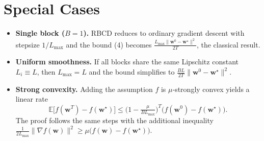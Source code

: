 \documentclass{article}
\newcommand{\E}{\mathbb{E}}
\begin{document}
\section*{Special Cases}
\begin{itemize}
\item \textbf{Single block ($B=1$).}  RBCD reduces to ordinary gradient descent
with stepsize $1/L_{\max}$ and the bound (4) becomes
$\frac{L_{\max}\|\bm w^{0}-\bm w^{\star}\|^{2}}{2T}$, the classical result.
\item \textbf{Uniform smoothness.}  If all blocks share the same Lipschitz constant
$L_i\equiv L$, then $L_{\max}=L$ and the bound simplifies to
$\frac{B L}{2T}\|\bm w^{0}-\bm w^{\star}\|^{2}$.
\item \textbf{Strong convexity.}  Adding the assumption
$f$ is $\mu$‑strongly convex yields a linear rate
\[
\E\!\big[f(\bm w^{T})-f(\bm w^{\star})\big]
\le
\big(1-\tfrac{\mu}{B L_{\max}}\big)^{T}
\big(f(\bm w^{0})-f(\bm w^{\star})\big).
\]
The proof follows the same steps with the additional inequality
$\frac{1}{2L_{\max}}\|\nabla f(\bm w)\|^{2}\ge \mu\big(f(\bm w)-f(\bm w^{\star})\big)$.
\end{itemize}
\end{document}
